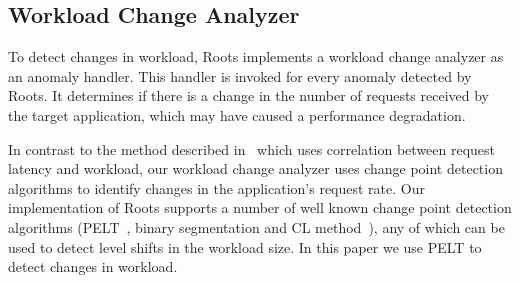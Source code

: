 
\subsection{Workload Change Analyzer}

To detect changes in workload, Roots implements a workload change analyzer as an anomaly handler. 
This handler is invoked for every anomaly detected by Roots.
It determines if there is a change in the number of requests
received by the target application, which
may have caused a performance degradation.

In contrast to the method described 
in~\cite{Magalhaes:2010:DPA:1906485.1906774,
Magalhaes:2011:RAP:1982185.1982234} which uses correlation between request
latency and workload, our 
workload change analyzer uses change point detection algorithms to 
identify changes in
the application's request rate. 
Our implementation of Roots supports a number of well known change point
detection algorithms (PELT~\cite{doi:10.1080/01621459.2012.737745}, binary segmentation 
and CL method~\cite{chen1993joint}), any of which can be used to detect level shifts in the
workload size.  In this paper we use PELT to detect changes in workload.

